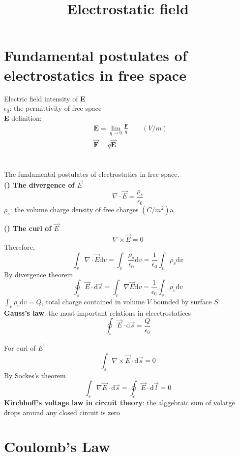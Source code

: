\documentclass[12pt, a4paper]{article}
\title{Electrostatic field}
\begin{document}
\section*{Fundamental postulates of electrostatics in free space}
Electric field intensity of \textbf{E} \\
$\epsilon_0$: the permittivity of free space \\
\textbf{E} definition:
\begin{align*}
&\textbf{E} = \lim_{q \to 0} \frac{\textbf{F}}{q} \qquad (V/m) \\
& \vec{\textbf{F}} = q \vec{\textbf{E}}
\end{align*}
\\ \\
The fundamental postulates of electrostatics in free space. \\
\textbf{() The divergence of $\vec{E}$}
$$
\nabla \cdot \vec{E} = \frac{\rho_s}{\epsilon_0}
$$
$\rho_s$: the volume charge density of free charges $(C/m^2)$a 

\textbf{() The curl of $\vec{E}$}
$$
\nabla \times \vec{E} = 0
$$
Therefore,
$$
\int_{v} \nabla \cdot \vec{E} \text{d}v = \int_v \frac{\rho_s}{\epsilon_0} \text{d}v = \frac{1}{\epsilon_0} \int_v \rho_v \text{d}v
$$
By divergence theorem
$$
\oint_s \vec{E} \cdot \text{d}\vec{s} = \int_v \nabla \vec{E} \text{d}v = \frac{1}{\epsilon_0} \int_v \rho_v \text{d}v
$$
$\int_v \rho_v \text{d}v = Q$, total charge contained in volume $V$ bounded by surface $S$ \\
\textbf{Gauss's law}: the most important relations in elcectrostatices
$$
\oint_s \vec{E} \cdot \text{d} \vec{s} = \frac{Q}{\epsilon_0}
$$

For curl of $\vec{E}$
$$
\int_s \nabla \times \vec{E} \cdot \text{d} \vec{s} = 0
$$
By Sockes's theorem
$$
\int_s \nabla \vec{E} \cdot \text{d} \vec{s} = \oint_c \vec{E} \cdot \text{d} \vec{l} = 0
$$
\textbf{Kirchhoff's voltage law in circuit theory}: the alggebraic sum of volatge drops around any closed circuit is zero
\newpage
\section*{Coulomb's Law}



\end{document}
